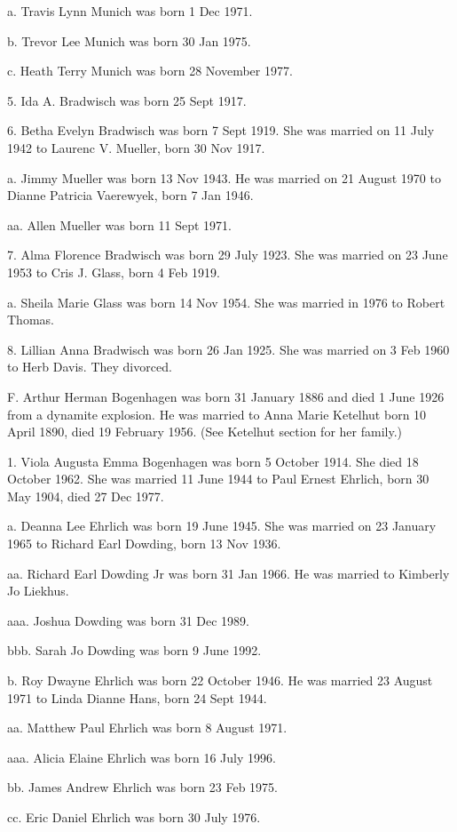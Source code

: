 \documentclass[a4paper]{article}
\begin{document}
a. Travis Lynn Munich was born 1 Dec 1971.

b. Trevor Lee Munich was born 30 Jan 1975.

c. Heath Terry Munich was born 28 November 1977.

5. Ida A. Bradwisch was born 25 Sept 1917.

6. Betha Evelyn Bradwisch was born 7 Sept 1919.  She was married on 11 July 1942 to Laurenc V. Mueller, born 30 Nov 1917.

a. Jimmy Mueller was born 13 Nov 1943.  He was married on 21 August 1970 to Dianne Patricia Vaerewyek, born 7 Jan 1946.
 
aa. Allen Mueller was born 11 Sept 1971.
 
7. Alma Florence Bradwisch was born 29 July 1923.  She was married on 23 June 1953 to Cris J. Glass, born 4 Feb 1919.
 
a. Sheila Marie Glass was born 14 Nov 1954.  She was married in 1976 to Robert  Thomas.
 
8. Lillian Anna Bradwisch was born 26 Jan 1925.  She was married on 3 Feb 1960 to Herb Davis.  They divorced.
 
F. Arthur Herman Bogenhagen was born 31 January 1886 and died 1 June 1926 from a dynamite explosion.  He was married to Anna Marie Ketelhut born 10 April 1890, died 19 February 1956.  (See Ketelhut section for her family.)

1. Viola Augusta Emma Bogenhagen was born 5 October 1914.  She died 18 October 1962.  She was married 11 June 1944 to Paul Ernest Ehrlich, born 30 May 1904, died 27 Dec 1977.

a. Deanna Lee Ehrlich was born 19 June 1945.  She was married on 23 January 1965 to Richard Earl Dowding, born 13 Nov 1936.

aa. Richard Earl Dowding Jr was born 31 Jan 1966. He was married to Kimberly Jo Liekhus.

aaa. Joshua Dowding was born 31 Dec 1989.

bbb. Sarah Jo Dowding was born 9 June 1992. 

b. Roy Dwayne Ehrlich was born 22 October 1946.  He was married 23 August 1971 to Linda Dianne Hans, born 24 Sept 1944.

aa. Matthew Paul Ehrlich was born 8 August 1971.

aaa. Alicia Elaine Ehrlich was born 16 July 1996.

bb. James Andrew Ehrlich was born 23 Feb 1975.

cc. Eric Daniel Ehrlich was born 30 July 1976.
\end{document}
